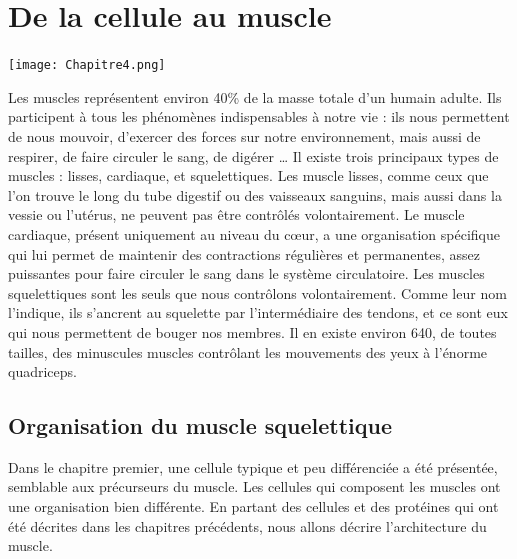 %
%
%
%
\chapter{De la cellule au muscle}

\begin{center}
\texttt{[image: Chapitre4.png]}

\end{center}
\newpage

Les muscles représentent environ 40\% de la masse totale d'un humain adulte. Ils participent à tous les phénomènes indispensables à notre vie : ils nous permettent de nous mouvoir, d'exercer des forces sur notre environnement, mais aussi de respirer, de faire circuler le sang, de digérer \dots 
Il existe trois principaux types de muscles : lisses, cardiaque, et squelettiques. Les muscle lisses, comme ceux que l'on trouve le long du tube digestif ou des vaisseaux sanguins, mais aussi dans la vessie ou l'utérus, ne peuvent pas être contrôlés volontairement. 
Le muscle cardiaque, présent uniquement au niveau du c\oe ur, a une organisation spécifique qui lui permet de maintenir des contractions régulières et permanentes, assez puissantes pour faire circuler le sang dans le système circulatoire. 
Les muscles squelettiques sont les seuls que nous contrôlons volontairement. Comme leur nom l'indique, ils s'ancrent au squelette par l'intermédiaire des tendons, et ce sont eux qui nous permettent de bouger nos membres.  
Il en existe environ 640, de toutes tailles, des minuscules muscles contrôlant les mouvements des yeux à l'énorme quadriceps.

\section{Organisation du muscle squelettique}

Dans le chapitre premier, une cellule typique et peu différenciée a été présentée, semblable aux précurseurs du muscle. Les cellules qui composent les muscles ont une organisation bien différente. 
En partant des cellules et des protéines qui ont été décrites dans les chapitres précédents, nous allons décrire l'architecture du muscle. 


